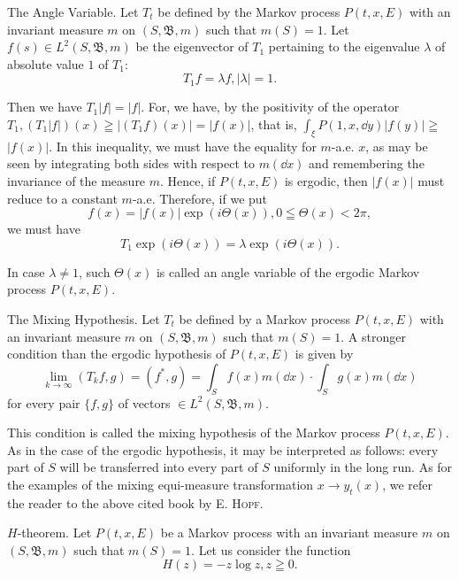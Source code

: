 \begin{enumerate}[1.]
The Angle Variable. Let $T_{t}$ be defined by the Markov process $P(t, x, E)$ with an invariant measure $m$ on $(S, \mathfrak{B}, m)$ such that $m(S) = 1$. Let $f(s) \in L^{2}(S, \mathfrak{B}, m)$ be the eigenvector of $T_{1}$ pertaining to the eigenvalue $\lambda$ of absolute value $1$ of $T_{1}$: 
\[
T _{1} f = \lambda f, | \lambda | = 1.
\]

Then we have $T_{1}|f| = |f|$. For, we have, by the positivity of the operator $T_{1}, (T_{1}|f|)(x) \geqq |(T_{1}f)(x)| = |f(x)|$, that is, $\int_{\xi} P(1, x, \dd y) |f(y)| \geqq$ 
$|f(x)|$. In this inequality, we must have the equality for $m$-a.e. $x$, as may be seen by integrating both sides with respect to $m(\dd x)$ and remembering the invariance of the measure $m$. Hence, if $P(t, x, E)$ is ergodic, then $|f(x)|$ must reduce to a constant $m$-a.e. Therefore, if we put 
\[
f (x) = | f (x) | \exp (i \Theta (x)), 0 \leqq \Theta (x) < 2 \pi ,
\]
we must have 
\[
T _{1} \exp (i \Theta (x)) = \lambda \exp (i \Theta (x)).
\]

In case $\lambda \neq 1$, such $\Theta(x)$ is called an angle variable of the ergodic Markov process $P(t, x, E)$. 

The Mixing Hypothesis. Let $T_{t}$ be defined by a Markov process $P(t, x, E)$ with an invariant measure $m$ on $(S, \mathfrak{B}, m)$ such that $m(S) = 1$. A stronger condition than the ergodic hypothesis of $P(t, x, E)$ is given by 
\begin{equation}\label{eq:XIII.3.4}
\lim\limits _{k \rightarrow \infty} (T _{k} f, g) = (f ^{*}, g) = \int_{S} f (x) m (\dd x) \cdot \int_{S} g (x) m (\dd x)
\end{equation}
for every pair $\{f, g\}$ of vectors $\in L^2(S, \mathfrak{B}, m)$. 


This condition is called the mixing hypothesis of the Markov process $P(t, x, E)$. As in the case of the ergodic hypothesis, it may be interpreted as follows: every part of $S$ will be transferred into every part of $S$ uniformly in the long run. As for the examples of the mixing equi-measure transformation $x \to y_t(x)$, we refer the reader to the above cited book by E. \textsc{Hopf}. 

$H$-theorem. Let $P(t, x, E)$ be a Markov process with an invariant measure $m$ on $(S, \mathfrak{B}, m)$ such that $m(S) = 1$. Let us consider the function 
\begin{equation}\label{eq:XIII.3.5}
H (z) = - z \log z, z \geqq 0.
\end{equation}


\end{enumerate}
